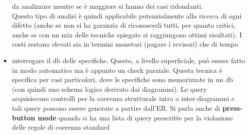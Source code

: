 \documentclass[a4paper,12pt, oneside]{book}
\begin{document}
\begin{itemize}
  da analizzare mentre se è maggiore si hanno dei casi ridondanti.\\
  Questo tipo di analisi è quindi applicabile potenzialmente alla ricerca di
  ogni difetto (anche se non si ha garanzia di riconoscerli tutti, per quanto
  critici, anche se con un mix delle tecniche spiegate si raggiungono ottimi
  risultati). I costi restano elevati sia in termini monetari (pagare i
  revisori) che di tempo
  \item interrogare il db delle specifiche. Questo, a livello superficiale, può
  essere fatto in modo automatico ma è appunto un check parziale. Questa tecnica
  è specifica per casi particolari, dove le specifiche sono memorizzate in un
  db (con quindi uno schema logico derivato dai diagrammi). Le query
  acquisiscono controlli per la coerenza strutturale intra o inter-diagrammi e
  tali query possono essere generate a partire dall'ER. Si parla anche di
  \textbf{press-button mode} quando si ha una lista di query prescritte per la
  violazione delle regole di coerenza standard\\
  

\end{itemize}
\end{document}
